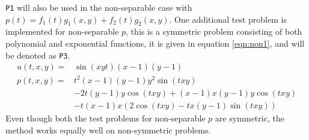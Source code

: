 \texttt{P1} will also be used in the non-separable case with $p(t) = f_1(t) g_1(x,y) + f_2(t) g_2(x,y)$.
One additional test problem is implemented for non-separable $p$, this is a symmetric problem consisting of both polynomial and exponential functions, it is given in equation \eqref{eqn:non1}, and will be denoted as \texttt{P3}.
\begin{equation} \label{eqn:non1}
\begin{aligned}
 u(t,x,y) = & \sin(x y t) (x-1) (y-1)\\
 p(t,x,y) = & t^2 (x-1) (y-1) y^2 \sin(t x y)\\ & -2 t (y-1) y \cos(t x y)+(x-1) x (y-1) y \cos(t x y)\\ & -t (x-1) x (2 \cos(t x y)-t x (y-1) \sin(t x y))
\end{aligned}
\end{equation}
Even though both the test problems for non-separable $p$ are symmetric, the method works equally well on non-symmetric problems. 
